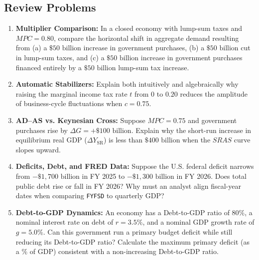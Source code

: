 \documentclass[11pt,letterpaper]{article}
\begin{document}
\subsection*{Review Problems}
\begin{enumerate}
    \item \textbf{Multiplier Comparison:} In a closed economy with lump-sum taxes and $MPC = 0.80$, compare the horizontal shift in aggregate demand resulting from (a) a $\$50\text{ billion}$ increase in government purchases, (b) a $\$50\text{ billion}$ cut in lump-sum taxes, and (c) a $\$50\text{ billion}$ increase in government purchases financed entirely by a $\$50\text{ billion}$ lump-sum tax increase.
    \item \textbf{Automatic Stabilizers:} Explain both intuitively and algebraically why raising the marginal income tax rate $t$ from $0$ to $0.20$ reduces the amplitude of business-cycle fluctuations when $c = 0.75$.
    \item \textbf{AD--AS vs. Keynesian Cross:} Suppose $MPC = 0.75$ and government purchases rise by $\Delta G = +\$100\text{ billion}$. Explain why the short-run increase in equilibrium real GDP ($\Delta Y_{\text{SR}}$) is less than $\$400\text{ billion}$ when the $SRAS$ curve slopes upward.
    \item \textbf{Deficits, Debt, and FRED Data:} Suppose the U.S. federal deficit narrows from $-\$1{,}700\text{ billion}$ in FY 2025 to $-\$1{,}300\text{ billion}$ in FY 2026. Does total public debt rise or fall in FY 2026? Why must an analyst align fiscal-year dates when comparing \texttt{FYFSD} to quarterly GDP?
    \item \textbf{Debt-to-GDP Dynamics:} An economy has a Debt-to-GDP ratio of $80\%$, a nominal interest rate on debt of $r = 3.5\%$, and a nominal GDP growth rate of $g = 5.0\%$. Can this government run a primary budget deficit while still reducing its Debt-to-GDP ratio? Calculate the maximum primary deficit (as a $\%$ of GDP) consistent with a non-increasing Debt-to-GDP ratio.
\end{enumerate}
\end{document}
